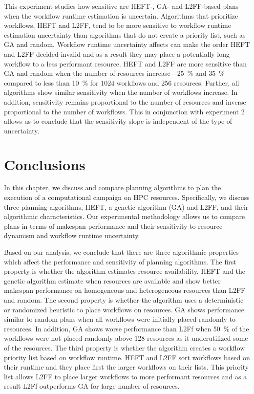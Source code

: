 This experiment studies how sensitive are HEFT-, GA- and L2FF-based plans when 
the workflow runtime estimation is uncertain. Algorithms that prioritize 
workflows, HEFT and L2FF, tend to be more sensitive to workflow runtime 
estimation uncertainty than algorithms that do not create a priority list, 
such as GA and random. Workflow runtime uncertainty affects can make the order 
HEFT and L2FF decided invalid and as a result they may place a potentially 
long workflow to a less performant resource. HEFT and L2FF are more sensitive 
than GA and random when the number of resources increase---25~\% and 35~\% 
compared to less than 10~\% for 1024 workflows and 256 resources. Further, all 
algorithms show similar sensitivity when the number of workflows increase. In 
addition, sensitivity remains proportional to the number of resources and 
inverse proportional to the number of workflows. This in conjunction with 
experiment 2 allows us to conclude that the sensitivity slope is independent 
of the type of uncertainty.

\section{Conclusions}
\label{sec:cf_algo_sel}
In this chapter, we discuss and compare planning algorithms to plan the 
execution of a computational campaign on HPC resources. Specifically, we 
discuss three planning algorithms, HEFT, a genetic algorithm (GA) and L2FF, 
and their algorithmic characteristics. Our experimental methodology allows us 
to compare plans in terms of makespan performance and their sensitivity to 
resource dynamism and workflow runtime uncertainty.

Based on our analysis, we conclude that there are three algorithmic properties 
which affect the performance and sensitivity of planning algorithms. The first 
property is whether the algorithm estimates resource availability. HEFT and 
the genetic algorithm estimate when resources are available and show better 
makespan performance on homogeneous and heterogeneous resources than L2FF and 
random. The second property is whether the algorithm uses a deterministic or 
randomized heuristic to place workflows on resources. GA shows performance 
similar to random plans when all workflows were initially placed randomly to 
resources. In addition, GA shows worse performance than L2Ff when 50~\% of the 
workflows were not placed randomly above 128 resources as it underutilized 
some of the resources. The third property is whether the algorithm creates a 
workflow priority list based on workflow runtime. HEFT and L2FF sort workflows 
based on their runtime and they place first the larger workflows on their 
lists. This priority list allows L2FF to place larger workflows to more 
performant resources and as a result L2Ff outperforms GA for large number of 
resources.

